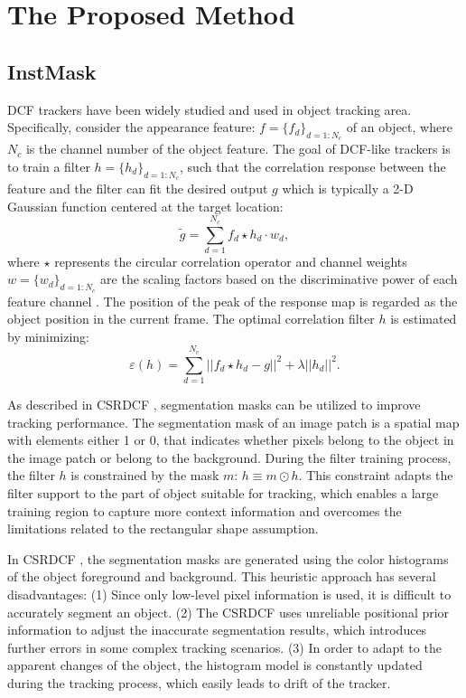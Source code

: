 \documentclass[review]{elsarticle}
\begin{document}
\section{The Proposed Method}

\subsection{InstMask} \label{sec:InstMask}
DCF trackers \cite{Bolme2010VisualOT, Danelljan2014AccurateSE, Henriques2015HighSpeedTW, Li2014ASA} have been widely studied and used in object tracking area. Specifically, consider the appearance feature: $f=\{f_d\}_{d=1:N_c}$ of an object, where $N_c$ is the channel number of the object feature. The goal of DCF-like trackers is to train a filter $h=\{h_d\}_{d=1:N_c}$, such that the correlation response between the feature and the filter can fit the desired output $g$ which is typically a 2-D Gaussian function centered at the target location: 
\begin{equation} \label{eq:dcf}
\tilde{g}=\sum_{d=1}^{N_c}f_d \star h_d \cdot w_d,
\end{equation}
where $\star$ represents the circular correlation operator and channel weights $w = \{w_d\}_{d=1:N_c}$ are the scaling factors based on the discriminative power of each feature channel \cite{Lukezic2017DiscriminativeCF}.
The position of the peak of the response map is regarded as the object position in the current frame.
The optimal correlation filter $h$ is estimated by minimizing:
\begin{equation}
\varepsilon(h) = \sum_{d=1}^{N_c}||f_d \star h_d - g||^2+\lambda||h_d||^2.
\end{equation}

As described in CSRDCF \cite{Lukezic2017DiscriminativeCF}, segmentation masks can be utilized to improve tracking performance. The segmentation mask of an image patch is a spatial map with elements either 1 or 0, that indicates whether pixels belong to the object in the image patch or belong to the background. During the filter training process, the filter $h$ is constrained by the mask $m$: $h \equiv m \odot h$. This constraint adapts the filter support to the part of object suitable for tracking, which enables a large training region to capture more context information and overcomes the limitations related to the rectangular shape assumption.

In CSRDCF \cite{Lukezic2017DiscriminativeCF}, the segmentation masks are generated using the color histograms of the object foreground and background. This heuristic approach has several disadvantages: (1) Since only low-level pixel information is used, it is difficult to accurately segment an object. (2) The CSRDCF uses unreliable positional prior information to adjust the inaccurate segmentation results, which introduces further errors in some complex tracking scenarios. (3) In order to adapt to the apparent changes of the object, the histogram model is constantly updated during the tracking process, which easily leads to drift of the tracker.
\end{document}
